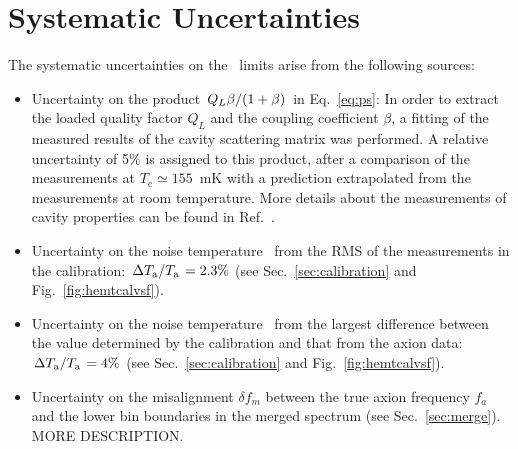 \section{Systematic Uncertainties} \label{sec:sys}
The systematic uncertainties on the \gagg\ limits arise from the 
following sources:
\begin{itemize}
\item Uncertainty on the product 
$\left.Q_L\beta\middle/\left(1+\beta\right)\right.$ in Eq.~\eqref{eq:ps}: 
In order to extract the loaded quality factor $Q_L$ and the coupling 
coefficient $\beta$, a fitting of the measured results of the cavity 
scattering matrix was performed. A relative uncertainty of 5\% is 
assigned to this product, after a comparison of the measurements at 
$T_\text{c}\simeq155$~mK with a prediction extrapolated from the measurements 
at room temperature. More details about the measurements of cavity properties 
can be found in Ref.~\cite{TASEHInstrumentation}.

\item Uncertainty on the noise temperature \ta\ from the RMS of 
the measurements in the calibration: 
$\left. \Delta T_\text{a}\middle/T_\text{a}\right.= 2.3\%$ 
(see Sec.~\ref{sec:calibration} and Fig.~\ref{fig:hemtcalvsf}).

\item Uncertainty on the noise temperature \ta\ from the largest difference 
between the value determined by the calibration and that from the axion 
data: $\left. \Delta T_\text{a}\middle/T_\text{a}\right.= 4\%$ 
(see Sec.~\ref{sec:calibration} and Fig.~\ref{fig:hemtcalvsf}). 

\item Uncertainty on the misalignment $\delta f_m$ between the true 
axion frequency $f_a$ and the lower bin boundaries in the merged spectrum 
(see Sec.~\ref{sec:merge}). MORE DESCRIPTION.


\end{itemize}
